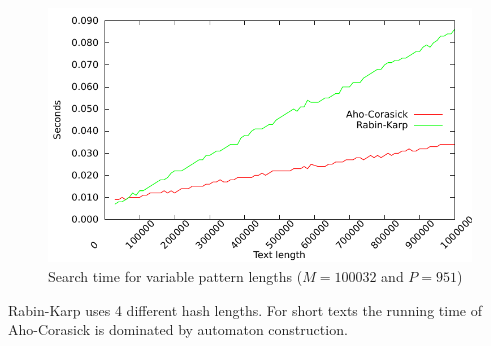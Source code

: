 \documentclass[final]{beamer}
\begin{document}
\begin{poster}
\begin{figure}
\centering
\includegraphics[width=25cm]{text_len.pdf}
\caption{
Search time for variable pattern lengths ($M = 100032$ and $P = 951$)
}
\label{fig:text_len_var}
\end{figure}
\begin{small}
Rabin-Karp uses 4 different hash lengths.
\newline
\newline
For short texts the running time of Aho-Corasick is dominated by automaton construction.
\end{small}


\end{poster}
\end{document}
